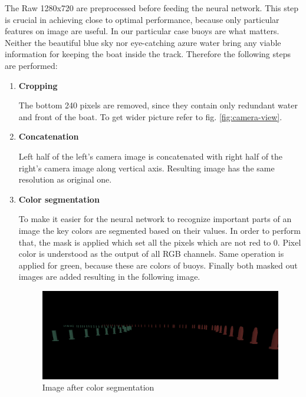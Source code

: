 The Raw 1280x720 are preprocessed before feeding the neural network. This step is crucial in achieving close to optimal performance, because only particular features on image are useful. In our particular case buoys are what matters. Neither the beautiful blue sky nor eye-catching azure water bring any viable information for keeping the boat inside the track. Therefore the following steps are performed:

\begin{enumerate}
    \item \textbf{Cropping}
    
    The bottom 240 pixels are removed, since they contain only redundant water and front of the boat. To get wider picture refer to fig. \ref{fig:camera-view}.
    
    \item \textbf{Concatenation}
    
    Left half of the left's camera image is concatenated with right half of the right's camera image along vertical axis. Resulting image has the same resolution as original one.
    
    \item \textbf{Color segmentation}
    
    To make it easier for the neural network to recognize important parts of an image the key colors are segmented based on their values. In order to perform that, the mask is applied which set all the pixels which are not red to 0. Pixel color is understood as the output of all RGB channels. Same operation is applied for green, because these are colors of buoys. Finally both masked out images are added resulting in the following image.
    
    \begin{figure}[h]
        \centering
        \includegraphics[width=16cm]{img/image_color_segmentation.png}
        \caption{Image after color segmentation}
        \label{fig:color-segmented-image}
    \end{figure}
    

\end{enumerate}
